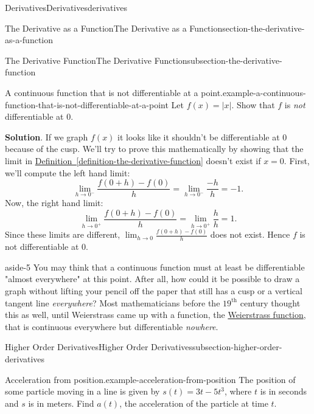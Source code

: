 \documentclass[oneside,10pt,]{book}
\numberwithin{equation}{section}
\begin{document}
\begin{chapterptx}{Derivatives}{}{Derivatives}{}{}{derivatives}
\begin{sectionptx}{The Derivative as a Function}{}{The Derivative as a Function}{}{}{section-the-derivative-as-a-function}
\begin{subsectionptx}{The Derivative Function}{}{The Derivative Function}{}{}{subsection-the-derivative-function}
\begin{example}{A continuous function that is not differentiable at a point.}{example-a-continuous-function-that-is-not-differentiable-at-a-point}
\hypertarget{p-113}{}%
Let \(f(x) = |x|\). Show that \(f\) is \emph{not} differentiable at \(0\).%
\par\smallskip%
\noindent\textbf{Solution}.\hypertarget{solution-24}{}\quad%
\hypertarget{p-114}{}%
If we graph \(f(x)\) it looks like it shouldn't be differentiable at \(0\) because of the cusp. We'll try to prove this mathematically by showing that the limit in \hyperref[definition-the-derivative-function]{Definition~\ref{definition-the-derivative-function}} doesn't exist if \(x=0\). First, we'll compute the left hand limit:%
\begin{equation*}
\lim_{h\to0^{-}}\frac{f(0+h)-f(0)}{h} = \lim_{h\to0^{-}}\frac{-h}{h} = -1.
\end{equation*}
Now, the right hand limit:%
\begin{equation*}
\lim_{h\to0^{+}}\frac{f(0+h)-f(0)}{h} = \lim_{h\to0^{+}}\frac{h}{h} = 1.
\end{equation*}
Since these limits are different, \(\lim_{h\to0}\frac{f(0+h)-f(0)}{h}\) does not exist. Hence \(f\) is not differentiable at \(0\).%
\end{example}
\begin{aside}{}{aside-5}%
\hypertarget{p-115}{}%
You may think that a continuous function must at least be differentiable "almost everywhere" at this point. After all, how could it be possible to draw a graph without lifting your pencil off the paper that still has a cusp or a vertical tangent line \emph{everywhere}? Most mathematicians before the \(19^{\text{th}}\) century thought this as well, until Weierstrass came up with a function, the \href{https://en.wikipedia.org/wiki/Weierstrass_function}{Weierstrass function}, that is continuous everywhere but differentiable \emph{nowhere}.%
\end{aside}
\end{subsectionptx}
%
%
\typeout{************************************************}
\typeout{************************************************}
%
\begin{subsectionptx}{Higher Order Derivatives}{}{Higher Order Derivatives}{}{}{subsection-higher-order-derivatives}
\begin{example}{Acceleration from position.}{example-acceleration-from-position}%
\hypertarget{p-116}{}%
The position of some particle moving in a line is given by \(s(t) = 3t-5t^{3}\), where \(t\) is in seconds and \(s\) is in meters. Find \(a(t)\), the acceleration of the particle at time \(t\).%
\par\smallskip%

\end{example}
\end{subsectionptx}
\end{sectionptx}
\end{chapterptx}
\end{document}
